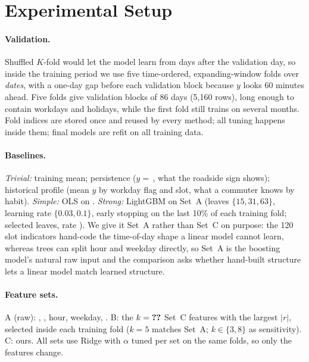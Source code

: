 \section{Experimental Setup}
\paragraph{Validation.} Shuffled $K$-fold would let the model learn from days after the validation
day, so inside the training period we use five time-ordered, expanding-window folds over
\emph{dates}, with a one-day gap before each validation block because $y$ looks 60 minutes ahead.
Five folds give validation blocks of 86 days (5,160 rows), long enough to contain workdays and
holidays, while the first fold still trains on several months. Fold indices are stored once and
reused by every method; all tuning happens inside them; final models are refit on all training data.

\paragraph{Baselines.} \emph{Trivial:} training mean; persistence ($\hat y=$\,, what
the roadside sign shows); historical profile (mean $y$ by workday flag and slot, what a commuter
knows by habit). \emph{Simple:} OLS on . \emph{Strong:} LightGBM \citep{ke2017} on
Set~A (leaves $\{15,31,63\}$, learning rate $\{0.03,0.1\}$, early stopping on the last 10\% of each
training fold; selected  leaves, rate ). We give it Set~A rather than Set~C on purpose: the 120 slot indicators
hand-code the time-of-day shape a linear model cannot learn, whereas trees can split hour and
weekday directly, so Set~A is the boosting model's natural raw input and the comparison asks
whether hand-built structure lets a linear model match learned structure.

\paragraph{Feature sets.} A (raw): , , hour, weekday,
. B: the $k=\res{sel.topk}$ Set~C features with the largest $|r|$, selected inside
each training fold ($k=5$ matches Set~A; $k\in\{3,8\}$ as sensitivity). C: ours. All sets use
Ridge with $\alpha$ tuned per set on the same folds, so only the features change.

